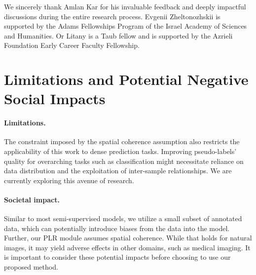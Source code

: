 \documentclass{article}
\begin{document}
\begin{ack}
We sincerely thank Amlan Kar for his invaluable feedback and deeply impactful discussions during the entire research process. Evgenii Zheltonozhskii is supported by the Adams Fellowships Program of the Israel Academy of Sciences and Humanities. Or Litany is a Taub fellow and is supported by the Azrieli Foundation Early Career Faculty Fellowship.
\end{ack}


\clearpage
{\small


}

\clearpage
\appendix{}


\renewcommand\thefigure{\thesection.\arabic{figure}} 
\renewcommand\thetable{\thesection.\arabic{table}} 
\renewcommand\theequation{\thesection.\arabic{equation}} 




\setcounter{figure}{0}  
\setcounter{table}{0}
\setcounter{equation}{0}

\section{Limitations and Potential Negative Social Impacts}
\paragraph{Limitations.}
The constraint imposed by the spatial coherence assumption also restricts the applicability of this work to dense prediction tasks. Improving pseudo-labels' quality for overarching tasks such as classification might necessitate reliance on data distribution and the exploitation of inter-sample relationships. We are currently exploring this avenue of research.

\paragraph{Societal impact.}
Similar to most semi-supervised models, we utilize a small subset of annotated data, which can potentially introduce biases from the data into the model. Further, our PLR module assumes spatial coherence. While that holds for natural images, it may yield adverse effects in other domains, such as medical imaging. It is important to consider these potential impacts before choosing to use our proposed method.
\end{document}

